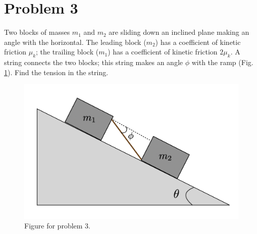 \documentclass[12pt]{article}
\begin{document}
\section*{Problem 3}
Two blocks of masses $m_{1}$ and $m_{2}$ are sliding down an inclined plane making an angle with the horizontal. The leading block ($m_{2}$) has a coefficient of kinetic friction $\mu_{k}$; the trailing block ($m_{1}$) has a coefficient of kinetic friction $2\mu_{k}$. A string connects the two blocks; this string makes an angle $\phi$ with the ramp (Fig. \ref{fig1}). Find the tension in the string.
\begin{figure}
\center
\includegraphics[scale=0.5]{m1m2}
\caption{Figure for problem 3.}\label{fig1}
\end{figure}
\end{document}
